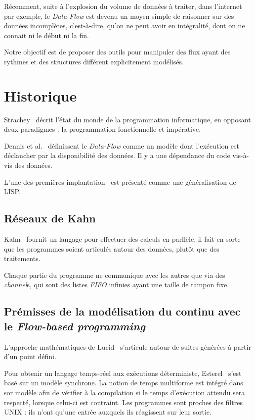 \documentclass{llncs}
\newcommand{\DF}{\emph{Data-Flow} }
\newcommand{\FB}{\emph{Flow-based programming} }
\begin{document}
Récemment, suite à l'explosion du volume de données à traiter, dans l'internet
par exemple, le \DF est devenu un moyen simple de raisonner sur des données
incomplètes, c'est-à-dire, qu'on ne peut avoir en intégralité, dont on ne connait ni le début ni la fin.

Notre objectif est de proposer des outils pour manipuler des flux ayant des
rythmes et des structures différent explicitement modélisés.

\section{Historique}
Strachey~\cite{Strachey73} décrit l'état du monde de la programmation
informatique, en opposant deux paradigmes : la programmation fonctionnelle et impérative.

Dennis et al.~\cite{Dennis72} définissent le \DF comme un modèle dont l'exécution
est déclancher par la disponibilité des données.
Il y a une dépendance du code vis-à-vis des données.

L'une des premières implantation~\cite{Dennis72} est présenté comme une généralisation
de LISP.

\subsection{Réseaux de Kahn}
Kahn~\cite{Kahn74} fournit un langage pour effectuer des calculs en parllèle,
il fait en sorte que les programmes soient articulés autour des données, plutôt que
des traitements.

Chaque partie du programme ne communique avec les autres que via des
\emph{channel}s, qui sont des listes \emph{FIFO} infinies ayant une taille de
tampon fixe.

\subsection{Prémisses de la modélisation du continu avec le \FB}
L'approche mathématiques de Lucid~\cite{AshcroftW76} s'articule
autour de suites générées à partir d'un point défini.

Pour obtenir un langage temps-réel aux exécutions déterministe, Esterel~\cite{Berry84}
s'est basé sur un modèle synchrone.
La notion de temps multiforme est intégré dans sor modèle afin de vérifier à la
compilation si le temps d'exécution attendu sera respecté, lorsque celui-ci est contraint.
Les programmes sont proches des filtres UNIX : ils n'ont qu'une entrée auxquels
ils réagissent sur leur sortie.
\end{document}
